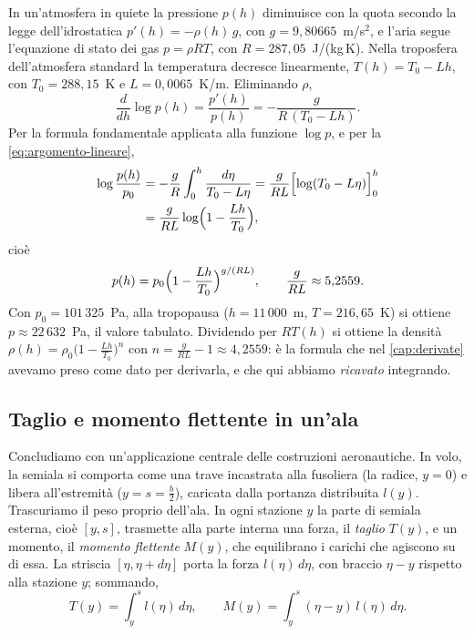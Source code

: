 \begin{esempio}\label{es:pressione-isa}
In un'atmosfera in quiete la pressione $p(h)$ diminuisce con la quota secondo la legge
dell'idrostatica $p'(h)=-\rho(h)\,g$, con $g=9{,}80665$~m/s$^{2}$, e l'aria segue l'equazione di stato dei gas
$p=\rho RT$, con $R=287{,}05$~J/(kg\,K). Nella troposfera dell'atmosfera standard la
temperatura decresce linearmente, $T(h)=T_{0}-Lh$, con $T_{0}=288{,}15$~K e
$L=0{,}0065$~K/m. Eliminando $\rho$,
\[
  \frac{d}{dh}\log p(h)=\frac{p'(h)}{p(h)}=-\frac g{R\,(T_{0}-Lh)} .
\]
Per la formula fondamentale applicata alla funzione $\log p$, e per la
\eqref{eq:argomento-lineare},
\[
\begin{aligned}
  \log\frac{p(h)}{p_{0}}&=-\frac gR\int_{0}^{h}\frac{d\eta}{T_{0}-L\eta}
  =\frac g{RL}\Bigl[\log(T_{0}-L\eta)\Bigr]_{0}^{h}\\
  &=\frac g{RL}\log\Bigl(1-\frac{Lh}{T_{0}}\Bigr),
\end{aligned}
\]
cioè
\begin{equation}\label{eq:pressione-isa}
  p(h)=p_{0}\Bigl(1-\frac{Lh}{T_{0}}\Bigr)^{g/(RL)}, \qquad \frac g{RL}\approx5{,}2559 .
\end{equation}
Con $p_{0}=101\,325$~Pa, alla tropopausa ($h=11\,000$~m, $T=216{,}65$~K) si ottiene
$p\approx22\,632$~Pa, il valore tabulato. Dividendo per $RT(h)$ si ottiene la densità
$\rho(h)=\rho_{0}\bigl(1-\frac{Lh}{T_{0}}\bigr)^{n}$ con $n=\frac g{RL}-1\approx4{,}2559$: è la formula
che nel \cref{cap:derivate} avevamo preso come dato per derivarla, e che qui abbiamo
\emph{ricavato} integrando.
\end{esempio}

\subsection{Taglio e momento flettente in un'ala}

Concludiamo con un'applicazione centrale delle costruzioni aeronautiche. In volo, la
semiala si comporta come una trave incastrata alla fusoliera (la radice, $y=0$) e libera
all'estremità ($y=s=\frac b2$), caricata dalla portanza distribuita $l(y)$. Trascuriamo il
peso proprio dell'ala. In ogni stazione $y$ la parte di semiala esterna, cioè
$[y,s]$, trasmette alla parte interna una forza, il \emph{taglio} $T(y)$, e un momento, il
\emph{momento flettente} $M(y)$, che equilibrano i carichi che agiscono su di essa. La
striscia $[\eta,\eta+d\eta]$ porta la forza $l(\eta)\,d\eta$, con braccio $\eta-y$ rispetto alla
stazione $y$; sommando,
\begin{equation}\label{eq:taglio-momento}
  T(y)=\int_{y}^{s}l(\eta)\,d\eta, \qquad M(y)=\int_{y}^{s}(\eta-y)\,l(\eta)\,d\eta .
\end{equation}

